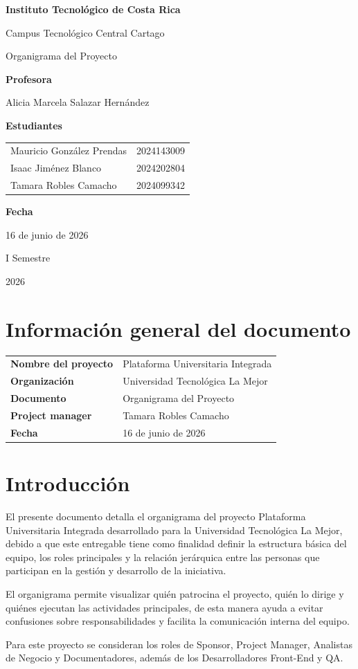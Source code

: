 \documentclass[11pt,spanish]{article}
\title{\DocumentoTitulo}
\author{\AutoresPortada}
\date{\FechaDocumento}
\makeatletter
\newcommand{\Institucion}{Instituto Tecnológico de Costa Rica}
\newcommand{\Campus}{Campus Tecnológico Central Cartago}
\newcommand{\DocumentoTitulo}{Organigrama del Proyecto}
\newcommand{\Profesor}{Alicia Marcela Salazar Hernández}
\newcommand{\FechaDocumento}{16 de junio de 2026}
\newcommand{\PeriodoAcademico}{I Semestre}
\newcommand{\AnioDocumento}{2026}
\newcommand{\AutoresPortada}{%
    \begin{tabular}{l@{\hspace{1.5cm}}r}
        Mauricio González Prendas & 2024143009\\
        Isaac Jiménez Blanco & 2024202804\\
        Tamara Robles Camacho & 2024099342
    \end{tabular}%
}
\newcommand{\MakeCover}{%
\begin{titlepage}
\thispagestyle{empty}
\centering

{\bfseries \huge \Institucion \par}
\vspace{0.25cm}
{\LARGE \Campus \par}

\vfill

{\huge \DocumentoTitulo \par}

\vfill

{\bfseries \LARGE Profesora \par}
{\Large \Profesor \par}

\vfill

{\bfseries \LARGE Estudiantes \par}
{\Large \AutoresPortada \par}

\vfill

{\bfseries\LARGE Fecha \par}
{\Large \FechaDocumento \par}

\vfill

{\LARGE \PeriodoAcademico \par}
{\LARGE \AnioDocumento \par}

\end{titlepage}%
}
\makeatother
\begin{document}
\hypersetup{pageanchor=false}

\MakeCover

\pagestyle{empty}
\tableofcontents
\clearpage
{}
\hypersetup{pageanchor=true}
\pagestyle{fancy}

\section{Información general del documento}

\begin{table}[H]
\centering
\begin{tabularx}{\textwidth}{p{5cm} Y}
\toprule
\textbf{Nombre del proyecto} & Plataforma Universitaria Integrada \\
\textbf{Organización} & Universidad Tecnológica La Mejor \\
\textbf{Documento} & \DocumentoTitulo \\
\textbf{Project manager} & Tamara Robles Camacho \\
\textbf{Fecha} & 16 de junio de 2026 \\
\bottomrule
\end{tabularx}
\end{table}

\section{Introducción}

El presente documento detalla el organigrama del proyecto Plataforma Universitaria Integrada desarrollado para la Universidad Tecnológica La Mejor, debido a que este entregable tiene como finalidad definir la estructura básica del equipo, los roles principales y la relación jerárquica entre las personas que participan en la gestión y desarrollo de la iniciativa.

El organigrama permite visualizar quién patrocina el proyecto, quién lo dirige y quiénes ejecutan las actividades principales, de esta manera ayuda a evitar confusiones sobre responsabilidades y facilita la comunicación interna del equipo.

Para este proyecto se consideran los roles de Sponsor, Project Manager, Analistas de Negocio y Documentadores, además de los Desarrolladores Front-End y QA.
\end{document}
